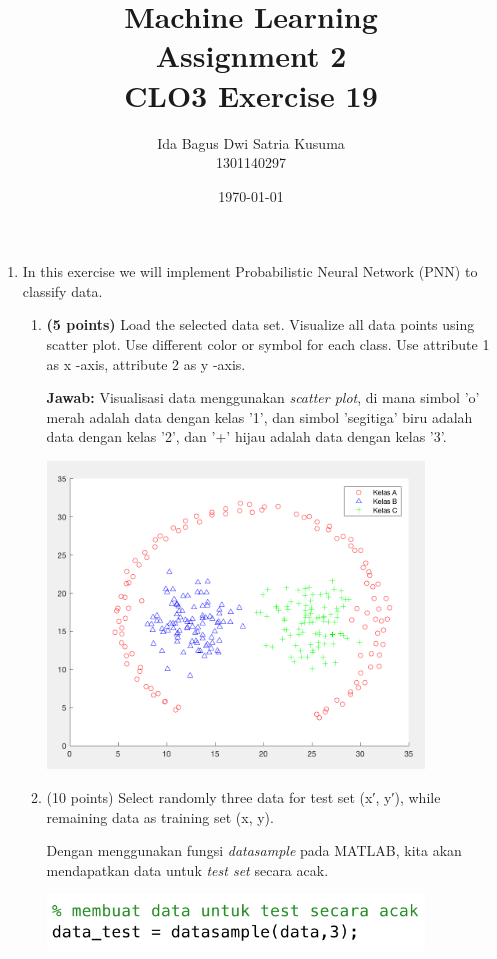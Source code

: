 \documentclass[12pt]{article}%
\begin{document}
\newcommand\scalemath[2]{\scalebox{#1}{\mbox{\ensuremath{\displaystyle #2}}}}
\title{Machine Learning \protect\\ Assignment 2 \protect\\ CLO3 Exercise 19} 
\author{Ida Bagus Dwi Satria Kusuma \protect\\ 1301140297}
\date{\today}
\maketitle

\begin{enumerate}
	\item In this exercise we will implement Probabilistic Neural Network (PNN) to classify data.
	\begin{enumerate}
		\item \textbf{(5 points)} Load the selected data set. Visualize all data points using scatter plot. Use different color or symbol for each class. Use attribute 1 as x -axis, attribute 2 as y -axis.

		\par \textbf{Jawab:} Visualisasi data menggunakan \textit{scatter plot}, di mana simbol 'o' merah adalah data dengan kelas '1', dan simbol 'segitiga' biru adalah data dengan kelas '2', dan '+' hijau adalah data dengan kelas '3'.
		\par \includegraphics[width=10cm]{ass2clo3no19_1} 

		\item (10 points) Select randomly three data for test set (x′, y′), while remaining data as training set (x, y).

		\par Dengan menggunakan fungsi \textit{datasample} pada MATLAB, kita akan mendapatkan data untuk \textit{test set} secara acak.
		\par \includegraphics[width=10cm]{ass2clo3no19_2} 


\end{enumerate}
\end{enumerate}
\end{document}
